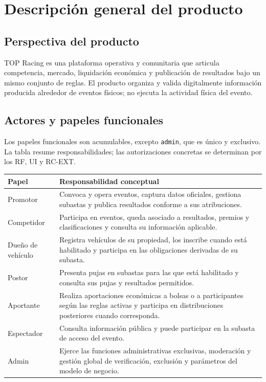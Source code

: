 \documentclass[10pt,letterpaper]{article}
\begin{document}
\section{Descripción general del producto}
\subsection{Perspectiva del producto}
TOP Racing es una plataforma operativa y comunitaria que articula competencia, mercado, liquidación económica y publicación de resultados bajo un mismo conjunto de reglas. El producto organiza y valida digitalmente información producida alrededor de eventos físicos; no ejecuta la actividad física del evento.

\subsection{Actores y papeles funcionales}
Los papeles funcionales son acumulables, excepto \texttt{admin}, que es único y exclusivo. La tabla resume responsabilidades; las autorizaciones concretas se determinan por los RF, UI y RC-EXT.
\begin{longtable}{P{2.8cm}P{11.5cm}}
\toprule
\textbf{Papel} & \textbf{Responsabilidad conceptual}\\
\midrule
Promotor & Convoca y opera eventos, captura datos oficiales, gestiona subastas y publica resultados conforme a sus atribuciones.\\
Competidor & Participa en eventos, queda asociado a resultados, premios y clasificaciones y consulta su información aplicable.\\
Dueño de vehículo & Registra vehículos de su propiedad, los inscribe cuando está habilitado y participa en las obligaciones derivadas de su subasta.\\
Postor & Presenta pujas en subastas para las que está habilitado y consulta sus pujas y resultados permitidos.\\
Aportante & Realiza aportaciones económicas a bolsas o a participantes según las reglas activas y participa en distribuciones posteriores cuando corresponda.\\
Espectador & Consulta información pública y puede participar en la subasta de acceso del evento.\\
Admin & Ejerce las funciones administrativas exclusivas, moderación y gestión global de verificación, exclusión y parámetros del modelo de negocio.\\
\bottomrule
\end{longtable}
\end{document}
